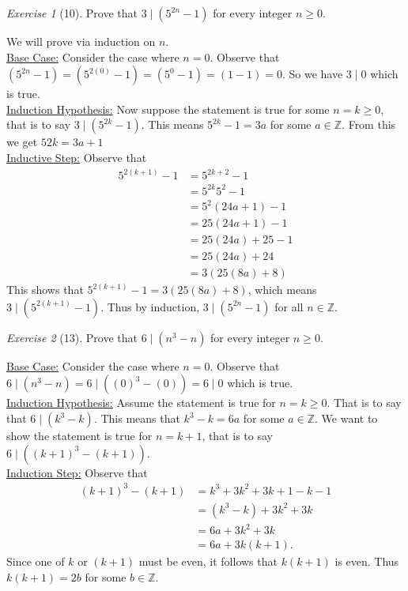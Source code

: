 \documentclass[12pt]{amsart}
\makeatletter
\theoremstyle{remark}
\newtheorem*{exercise}{Exercise}%
\def\ZZ{\ensuremath{\mathbb Z}}
\renewenvironment{proof}[1][\proofname]{\par\doublespacing
  \pushQED{\qed}%
  \normalfont \topsep6\p@\@plus6\p@\relax
  \list{}{%
    \settowidth{\leftmargin}{\itshape\proofname:\hskip\labelsep}%
    \setlength{\labelwidth}{0pt}%
    \setlength{\itemindent}{-\leftmargin}%
  }%
  \item[\hskip\labelsep\itshape#1\@addpunct{:}]\ignorespaces
}{%
  \popQED\endlist\@endpefalse
  \singlespacing
}
\theoremstyle{mycomment}
\makeatother
\begin{document}
\begin{exercise}[10] Prove that $3\mid(5^{2n}-1)$ for every integer $n\ge 0$.
\begin{proof}
  We will prove via induction on $n$. \\
  \underline{Base Case:} Consider the case where $n=0$. Observe that $(5^{2n} -1) = (5^{2(0)} - 1) =( 5^0 - 1) =( 1 - 1) = 0$. So we have $3 \mid 0$ which is true.  \\
  \underline{Induction Hypothesis:} Now suppose the statement is true for some $n = k \geq 0$, that is to say $ 3 \mid (5^{2k} - 1)$. This means $5^{2k} - 1 = 3a  $ for some $a \in \ZZ$. From this we get $5{2k} = 3a + 1$ \\
  \underline{Inductive Step:} Observe that
  \begin{align*}
    5^{2(k+1)}-1 &= 5^{2k+2} - 1 \\
                 &= 5^{2k}5^{2} - 1 \\
                 &= 5^2(24a + 1) - 1 \\
                 &= 25(24a + 1) - 1 \\
                 &= 25(24a) + 25 - 1 \\
                 &= 25(24a) + 24 \\
                 &= 3(25(8a) + 8)
  \end{align*}
  This shows that $5^{2(k+1)} - 1 = 3(25(8a) + 8)$, which means $3 \mid (5^{2(k+1)} - 1)$. Thus by induction, $3 \mid (5^{2n} - 1)$ for all $n \in \ZZ$.
\end{proof}
\end{exercise}

\begin{exercise}[13] Prove that $6\mid(n^{3}-n)$ for every integer $n\ge 0$.
\begin{proof}
  \underline{Base Case:} Consider the case where $n = 0$. Observe that $6\mid(n^{3}-n) = 6\mid((0)^3 - (0)) = 6 \mid 0$ which is true.  \\
  \underline{Induction Hypothesis:} Assume the statement is true for $n = k \geq 0$. That is to say that $6\mid(k^{3}-k)$. This means that $k^3 - k = 6a$ for some $a \in \ZZ$. We want to show the statement is true for $n = k + 1$, that is to say $6 \mid ((k+1)^3 - (k+1))$.\\
  \underline{Induction Step:} Observe that
  \begin{align*}
    (k+1)^3 - (k+1) &= k^3 + 3k^2 + 3k + 1 - k - 1 \\
                    &= (k^3 - k) + 3k^2 + 3k \\
                    &= 6a + 3k^2 + 3k  \\
                    &= 6a + 3k(k+1).
  \end{align*}
  Since one of $k$ or $(k+1)$ must be even, it follows that $k(k+1)$ is even. Thus $k(k+1) = 2b$ for some $b \in \ZZ$.
\end{proof}
\end{exercise}
\end{document}
